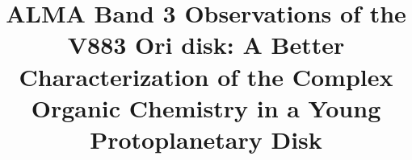 \documentclass[linenumbers, twocolumn, times]{aastex631}
\begin{document}
\title{ALMA Band 3 Observations of the V883 Ori disk: A Better Characterization of the Complex Organic Chemistry in a Young Protoplanetary Disk}


\end{document}
